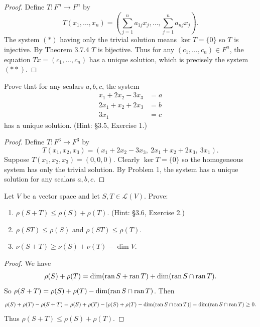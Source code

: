 \begin{proof}
    Define $T : F^n \to F^n$ by 
    \[T(x_1, \ldots, x_n) = \left(\sum_{j=1}^n a_{1j}x_j, \ldots, \sum_{j=1}^n a_{nj}x_j\right).\]
    The system $(*)$ having only the trivial solution means $\ker T = \{0\}$
        so $T$ is injective. 
    By Theorem 3.7.4 $T$ is bijective.
    Thus for any $(c_1, \ldots, c_n) \in F^n$, the equation $Tx = (c_1, \ldots, c_n)$ 
        has a unique solution, which is precisely the system $(**)$.
\end{proof}

\begin{tcolorbox}[title=Problem 2, breakable]
    Prove that for any scalars $a, b, c$, the system
    \begin{align*}
        x_1 + 2x_2 - 3x_3 &= a \\
        2x_1 + x_2 + 2x_3 &= b \\
        3x_1 \phantom{{}+ x_2} \phantom{{}- 3x_3} &= c
    \end{align*}
    has a unique solution. (Hint: \S 3.5, Exercise 1.)
\end{tcolorbox}

\begin{proof}
    Define $T : F^3 \to F^3$ by 
    \[T(x_1, x_2, x_3) = (x_1 + 2x_2 - 3x_3, \ 2x_1 + x_2 + 2x_3, \ 3x_1).\]
    Suppose $T(x_1, x_2, x_3) = (0, 0, 0)$. 
    Clearly $\ker T = \{0\}$ so the 
    homogeneous system has only the trivial solution. 
    By Problem 1, the system 
        has a unique solution for any scalars $a, b, c$.
\end{proof}

\newpage
\begin{tcolorbox}[title=Problem 3, breakable]
    Let $V$ be a vector space and let $S, T \in \mathcal{L}(V)$. Prove:
    \begin{enumerate}
        \item[(i)] $\rho(S + T) \le \rho(S) + \rho(T)$. (Hint: \S 3.6, Exercise 2.)
        \item[(ii)] $\rho(ST) \le \rho(S)$ and $\rho(ST) \le \rho(T)$.
        \item[(iii)] $\nu(S + T) \ge \nu(S) + \nu(T) - \dim V$.
    \end{enumerate}
\end{tcolorbox}

\begin{proof}
    We have 
    \[\rho(S) + \rho(T) = \dim(\operatorname{ran} S + \operatorname{ran} T) + \dim(\operatorname{ran} S \cap \operatorname{ran} T).\]
    So $\rho(S + T) = \rho(S) + \rho(T) - \dim(\operatorname{ran} S \cap \operatorname{ran} T)$.
    Then 
    \[\rho(S) + \rho(T) - \rho(S + T) = \rho(S) + \rho(T) - [\rho(S) + \rho(T) - \dim(\operatorname{ran} S \cap \operatorname{ran} T)] = \dim(\operatorname{ran} S \cap \operatorname{ran} T) \ge 0.\]
    Thus $\rho(S + T) \le \rho(S) + \rho(T)$.
\end{proof}

